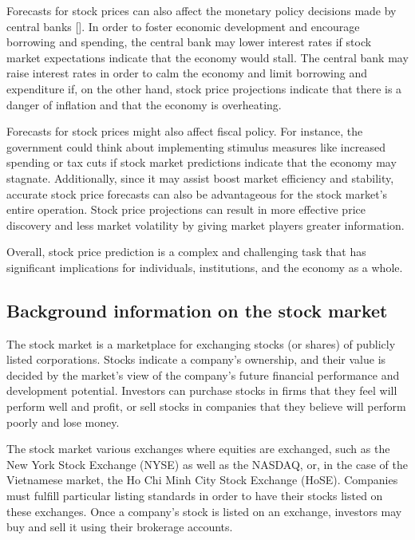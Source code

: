 \documentclass[a4paper]{article}
\begin{document}
Forecasts for stock prices can also affect the monetary policy decisions made by central banks [\cite{li2010impact}]. In order to foster economic development and encourage borrowing and spending, the central bank may lower interest rates if stock market expectations indicate that the economy would stall. The central bank may raise interest rates in order to calm the economy and limit borrowing and expenditure if, on the other hand, stock price projections indicate that there is a danger of inflation and that the economy is overheating.

Forecasts for stock prices might also affect fiscal policy. For instance, the government could think about implementing stimulus measures like increased spending or tax cuts if stock market predictions indicate that the economy may stagnate. Additionally, since it may assist boost market efficiency and stability, accurate stock price forecasts can also be advantageous for the stock market's entire operation. Stock price projections can result in more effective price discovery and less market volatility by giving market players greater information.

Overall, stock price prediction is a complex and challenging task that has significant implications for individuals, institutions, and the economy as a whole.
\subsection{Background information on the stock market}

The stock market is a marketplace for exchanging stocks (or shares) of publicly listed corporations. Stocks indicate a company's ownership, and their value is decided by the market's view of the company's future financial performance and development potential. Investors can purchase stocks in firms that they feel will perform well and profit, or sell stocks in companies that they believe will perform poorly and lose money.

The stock market various exchanges where equities are exchanged, such as the New York Stock Exchange (NYSE) as well as the NASDAQ, or, in the case of the Vietnamese market, the Ho Chi Minh City Stock Exchange (HoSE). Companies must fulfill particular listing standards in order to have their stocks listed on these exchanges. Once a company's stock is listed on an exchange, investors may buy and sell it using their brokerage accounts.
\end{document}
